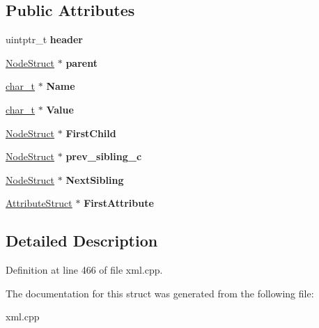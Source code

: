 \subsection*{Public Attributes}
\begin{DoxyCompactItemize}
\item 
\hypertarget{structphys_1_1xml_1_1NodeStruct_a68ff269f03bdab91cbeb96174d4df3a8}{
uintptr\_\-t {\bfseries header}}
\label{d7/dd5/structphys_1_1xml_1_1NodeStruct_a68ff269f03bdab91cbeb96174d4df3a8}

\item 
\hypertarget{structphys_1_1xml_1_1NodeStruct_a691cde3ddaad2c7dacf780a6c4b9c8fe}{
\hyperlink{structphys_1_1xml_1_1NodeStruct}{NodeStruct} $\ast$ {\bfseries parent}}
\label{d7/dd5/structphys_1_1xml_1_1NodeStruct_a691cde3ddaad2c7dacf780a6c4b9c8fe}

\item 
\hypertarget{structphys_1_1xml_1_1NodeStruct_ab27d7b1bf921844a9af1f4083f59f198}{
\hyperlink{namespacephys_1_1xml_afc87705cd1c2917d87b879715a2d8f6e}{char\_\-t} $\ast$ {\bfseries Name}}
\label{d7/dd5/structphys_1_1xml_1_1NodeStruct_ab27d7b1bf921844a9af1f4083f59f198}

\item 
\hypertarget{structphys_1_1xml_1_1NodeStruct_a183475da096134672af3de253b2cc4c3}{
\hyperlink{namespacephys_1_1xml_afc87705cd1c2917d87b879715a2d8f6e}{char\_\-t} $\ast$ {\bfseries Value}}
\label{d7/dd5/structphys_1_1xml_1_1NodeStruct_a183475da096134672af3de253b2cc4c3}

\item 
\hypertarget{structphys_1_1xml_1_1NodeStruct_ac4bc916ede972c2bef0ded054d703ae9}{
\hyperlink{structphys_1_1xml_1_1NodeStruct}{NodeStruct} $\ast$ {\bfseries FirstChild}}
\label{d7/dd5/structphys_1_1xml_1_1NodeStruct_ac4bc916ede972c2bef0ded054d703ae9}

\item 
\hypertarget{structphys_1_1xml_1_1NodeStruct_ab803e620f77fc53cdbb313702e9de966}{
\hyperlink{structphys_1_1xml_1_1NodeStruct}{NodeStruct} $\ast$ {\bfseries prev\_\-sibling\_\-c}}
\label{d7/dd5/structphys_1_1xml_1_1NodeStruct_ab803e620f77fc53cdbb313702e9de966}

\item 
\hypertarget{structphys_1_1xml_1_1NodeStruct_a45f6a03ead3f9f87d6d4e870dcbb57ad}{
\hyperlink{structphys_1_1xml_1_1NodeStruct}{NodeStruct} $\ast$ {\bfseries NextSibling}}
\label{d7/dd5/structphys_1_1xml_1_1NodeStruct_a45f6a03ead3f9f87d6d4e870dcbb57ad}

\item 
\hypertarget{structphys_1_1xml_1_1NodeStruct_a9ba833be049cf3440a71f8cdb89e54d7}{
\hyperlink{structphys_1_1xml_1_1AttributeStruct}{AttributeStruct} $\ast$ {\bfseries FirstAttribute}}
\label{d7/dd5/structphys_1_1xml_1_1NodeStruct_a9ba833be049cf3440a71f8cdb89e54d7}

\end{DoxyCompactItemize}


\subsection{Detailed Description}


Definition at line 466 of file xml.cpp.



The documentation for this struct was generated from the following file:\begin{DoxyCompactItemize}
\item 
xml.cpp\end{DoxyCompactItemize}
